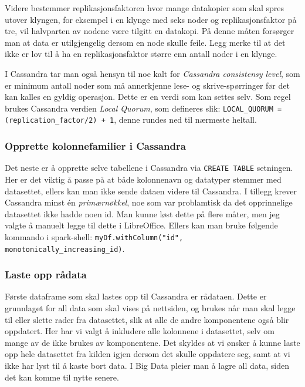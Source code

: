 Videre bestemmer replikasjonsfaktoren hvor mange datakopier som skal spres utover klyngen, for eksempel i en klynge med seks noder og replikasjonsfaktor på tre, vil halvparten av nodene være tilgitt en datakopi. På denne måten forsørger man at data er utilgjengelig dersom en node skulle feile. Legg merke til at det ikke er lov til å ha en replikasjonsfaktor større enn antall noder i en klynge. 

I Cassandra tar man også hensyn til noe kalt for \textit{Cassandra consistensy level}, som er minimum antall noder som må annerkjenne lese- og skrive-spørringer før det kan kalles en gyldig operasjon. Dette er en verdi som kan settes selv. Som regel brukes Cassandra verdien \textit{Local Quorum}, som defineres slik: \lstinline{LOCAL_QUORUM = (replication_factor/2) + 1}, denne rundes ned til nærmeste heltall.

\subsubsection{Opprette kolonnefamilier i Cassandra}
Det neste er å opprette selve tabellene i Cassandra via \lstinline{CREATE TABLE} setningen. Her er det viktig å passe på at både kolonnenavn og datatyper stemmer med datasettet, ellers kan man ikke sende dataen videre til Cassandra. I tillegg krever Cassandra minst én \textit{primærnøkkel}, noe som var problamtisk da det opprinnelige datasettet ikke hadde noen id. Man kunne løst dette på flere måter, men jeg valgte å manuelt legge til dette i LibreOffice. Ellers kan man bruke følgende kommando i spark-shell: \lstinline{myDf.withColumn("id", monotonically_increasing_id)}.


\subsubsection{Laste opp rådata}
Første dataframe som skal lastes opp til Cassandra er rådataen. Dette er grunnlaget for all data som skal vises på nettsiden, og brukes når man skal legge til eller slette rader fra datasettet, slik at alle de andre komponentene også blir oppdatert. Her har vi valgt å inkludere alle kolonnene i datasettet, selv om mange av de ikke brukes av komponentene. Det skyldes at vi ønsker å kunne laste opp hele datasettet fra kilden igjen dersom det skulle oppdatere seg, samt at vi ikke har lyst til å kaste bort data. I Big Data pleier man å lagre all data, siden det kan komme til nytte senere.

